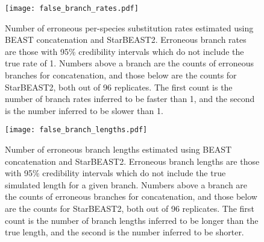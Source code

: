 \documentclass[12pt]{article}
\begin{document}
\clearpage

\begin{figure}[htb!]
\centering
\texttt{[image: false\_branch\_rates.pdf]}
\caption
{Number of erroneous per-species substitution rates estimated using BEAST concatenation and StarBEAST2. Erroneous
branch rates are those with 95\% credibility intervals which do not include the true rate of 1.
Numbers above a branch are the counts of erroneous branches for concatenation, and those
below are the counts for StarBEAST2, both out of 96 replicates. The first count is
the number of branch rates inferred to be faster than 1, and the
second is the number inferred to be slower than 1.}
\label{fig:spilsBranchRates}
\end{figure}

\begin{figure}[htb!]
\centering
\texttt{[image: false\_branch\_lengths.pdf]}
\caption
{Number of erroneous branch lengths estimated using BEAST concatenation and StarBEAST2. Erroneous
branch lengths are those with 95\% credibility intervals which do not include the true simulated length for a given branch.
Numbers above a branch are the counts of erroneous branches for concatenation, and those
below are the counts for StarBEAST2, both out of 96 replicates. The first count is
the number of branch lengths inferred to be longer than the true length, and the
second is the number inferred to be shorter.}
\label{fig:spilsBranchLengths}
\end{figure}

\clearpage
\end{document}
